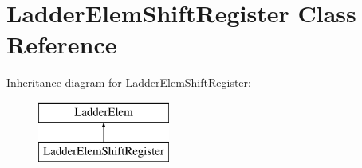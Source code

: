 \hypertarget{class_ladder_elem_shift_register}{\section{Ladder\-Elem\-Shift\-Register Class Reference}
\label{class_ladder_elem_shift_register}
}
Inheritance diagram for Ladder\-Elem\-Shift\-Register\-:\begin{figure}[H]
\begin{center}
\leavevmode
\includegraphics[height=2.000000cm]{class_ladder_elem_shift_register}
\end{center}
\end{figure}
